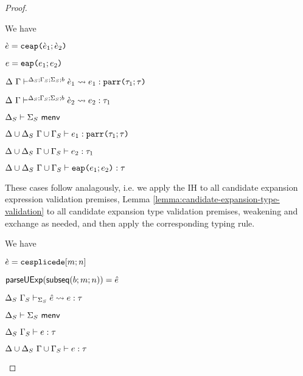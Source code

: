 \begin{proof}
\begin{byCases}
\item[\text{(\ref{rule:cvalidE-U-ap})}] We have
\begin{pfsteps*}
  \item $\grave{e}=\texttt{ceap}\texttt{(}\grave{e}_1; \grave{e}_2\texttt{)}$ 
  \item $e=\texttt{eap}\texttt{(}e_1; e_2\texttt{)}$ 
  \item $\Delta~\Gamma\vdash^{\Delta_S; \Gamma_S; \Sigma_S; b} \grave{e}_1 \leadsto e_1 : \texttt{parr}\texttt{(}\tau_1; \tau\texttt{)}$  
  \item $\Delta~\Gamma\vdash^{\Delta_S; \Gamma_S; \Sigma_S; b} \grave{e}_2 \leadsto e_2 : \tau_1$  
  \item $\Delta_S \vdash \Sigma_S~\mathsf{menv}$  
  \item $\Delta \cup \Delta_S~\Gamma \cup \Gamma_S \vdash e_1 : \texttt{parr}\texttt{(}\tau_1; \tau\texttt{)}$  
  \item $\Delta \cup \Delta_S~\Gamma \cup \Gamma_S \vdash e_2 : \tau_1$  
  \item $\Delta \cup \Delta_S~\Gamma \cup \Gamma_S \vdash \texttt{eap}\texttt{(}e_1; e_2\texttt{)} : \tau$ 
\end{pfsteps*}
\resetpfcounter

\item[\text{(\ref{rule:cvalidE-U-tlam}) through (\ref{rule:cvalidE-U-case})}] These cases follow analagously, i.e. we apply the IH to all candidate expansion expression validation premises, Lemma \ref{lemma:candidate-expansion-type-validation} to all candidate expansion type validation premises, weakening and exchange as needed, and then apply the corresponding typing rule.
\\

\item[\text{(\ref{rule:cvalidE-U-splicede})}] We have
\begin{pfsteps*}
  \item $\grave{e}=\texttt{cesplicede}[m; n]$ 
  \item $\mathsf{parseUExp}(\mathsf{subseq}(b; m; n))=\hat{e}$ 
  \item $\Delta_S~\Gamma_S \vdash_{\Sigma_S} \hat{e} \leadsto e : \tau$  
  \item $\Delta_S \vdash \Sigma_S~\mathsf{menv}$  
  \item $\Delta_S~\Gamma_S \vdash e : \tau$  
  \item $\Delta \cup \Delta_S~\Gamma \cup \Gamma_S \vdash e : \tau$ 
\end{pfsteps*}
\resetpfcounter
\end{byCases}
\end{proof}

